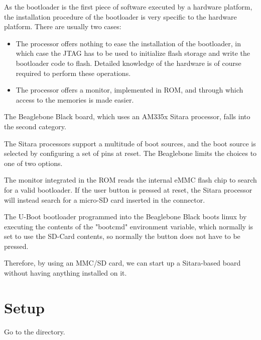 
As the bootloader is the first piece of software executed by a
hardware platform, the installation procedure of the bootloader is
very specific to the hardware platform. There are usually two cases:

\begin{itemize}

\item The processor offers nothing to ease the installation of the
  bootloader, in which case the JTAG has to be used to initialize
  flash storage and write the bootloader code to flash. Detailed
  knowledge of the hardware is of course required to perform these
  operations.

\item The processor offers a monitor, implemented in ROM, and through
  which access to the memories is made easier.

\end{itemize}

The Beaglebone Black board, which uses an AM335x Sitara processor, falls into
the second category. 

The Sitara processors support a multitude of boot sources, and the boot
source is selected by configuring a set of pins at reset.
The Beaglebone limits the choices to one of two options.

The monitor integrated in the ROM reads the internal
eMMC flash chip to search for a valid bootloader.
If the user button is pressed at reset, the Sitara processor will instead search
for a micro-SD card inserted in the connector.

The U-Boot bootloader programmed into the Beaglebone Black boots linux
by executing the contents of the "bootcmd" environment variable, 
which normally is set to use the SD-Card contents, so normally
the button does not have to be pressed.

Therefore, by using an MMC/SD card, we can
start up a Sitara-based board without having anything installed on it.



\section{Setup}

Go to the  directory. 

